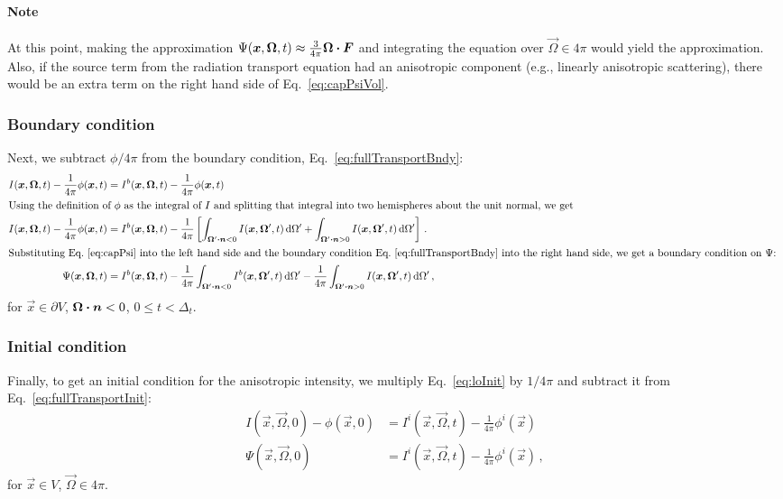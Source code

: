 \paragraph{Note} At this point, making the approximation $\Psi(\bm{x},
\bm{\Omega}, t) \approx \frac{3}{4\pi} \bm{\Omega}\bm{\cdot} \bm{F}$ and
integrating the equation over $\vec{\Omega} \in 4\pi$ would yield the \Pone{}
approximation. Also, if the source term from the radiation transport equation
had an anisotropic component (e.g., linearly anisotropic scattering), there
would be an extra term on the right hand side of Eq.~\eqref{eq:capPsiVol}.

\subsubsection{Boundary condition}
Next, we subtract $\phi/4\pi$ from the boundary condition,
Eq.~\eqref{eq:fullTransportBndy}:
\begin{align}\nonumber
  I(\bm{x}, \bm{\Omega}, t) - \frac{1}{4\pi} \phi(\bm{x}, t)
  &= I^b(\bm{x}, \bm{\Omega}, t) - \frac{1}{4\pi} \phi(\bm{x}, t)
  \\
  \intertext{Using the definition of $\phi$ as the integral of $I$ and
  splitting that integral into two hemispheres about the unit normal, we get 
  }\nonumber
  I(\bm{x}, \bm{\Omega}, t) - \frac{1}{4\pi} \phi(\bm{x}, t)
  &= I^b(\bm{x}, \bm{\Omega}, t) - \frac{1}{4\pi}
  \left[ 
   \int_{\bm{\Omega}' \bm{\cdot} \bm{n} < 0} I(\bm{x}, \bm{\Omega}', t) \mathop{}\!\mathrm{d} \Omega'
 + \int_{\bm{\Omega}' \bm{\cdot} \bm{n} > 0} I(\bm{x}, \bm{\Omega}', t) \mathop{}\!\mathrm{d} \Omega'
  \right]\,.
  \\ 
  \intertext{Substituting Eq.~\eqref{eq:capPsi} into the left hand side and the
  boundary condition Eq.~\eqref{eq:fullTransportBndy} into the right hand side,
  we get a boundary condition on $\Psi$:
  } \label{eq:capPsiBndy}
 \Psi(\bm{x}, \bm{\Omega}, t) 
  &= I^b(\bm{x}, \bm{\Omega}, t) - \frac{1}{4\pi}
 \int_{\bm{\Omega}' \bm{\cdot} \bm{n} < 0} I^b(\bm{x}, \bm{\Omega}', t) \mathop{}\!\mathrm{d} \Omega'
 - \frac{1}{4\pi}
 \int_{\bm{\Omega}' \bm{\cdot} \bm{n} > 0} I(\bm{x}, \bm{\Omega}', t) \mathop{}\!\mathrm{d} \Omega'
 \,,
\end{align}
for $\vec{x} \in \partial V$, $\bm{\Omega} \bm{\cdot} \bm{n} < 0$, $0 \le t <
\Delta_t$.

\subsubsection{Initial condition}
Finally, to get an initial condition for the anisotropic intensity, we
multiply Eq.~\eqref{eq:loInit} by $1/4\pi$ and subtract it from
Eq.~\eqref{eq:fullTransportInit}:
\begin{align}\nonumber
 I(\vec{x}, \vec{\Omega}, 0) - \phi(\vec{x}, 0)
 &= I^i(\vec{x}, \vec{\Omega}, t) - \frac1{4\pi} \phi^i(\vec{x})
 \\ \label{eq:capPsiInit}
 \Psi(\vec{x}, \vec{\Omega}, 0)
 &= I^i(\vec{x}, \vec{\Omega}, t) - \frac1{4\pi} \phi^i(\vec{x})\,,
\end{align}
for $\vec{x} \in V$, $\vec{\Omega} \in 4\pi$.

